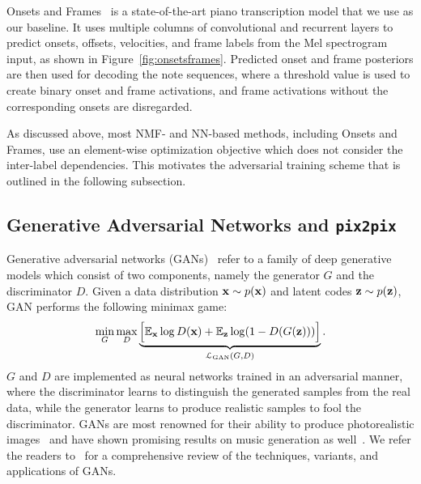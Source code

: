 Onsets and Frames~\cite{hawthorne2018onsetsframes} is a state-of-the-art piano transcription model that we use as our baseline.
It uses multiple columns of convolutional and recurrent layers to predict onsets, offsets, velocities, and frame labels from the Mel spectrogram input, as shown in Figure~\ref{fig:onsetsframes}.
Predicted onset and frame posteriors are then used for decoding the note sequences, where a threshold value is used to create binary onset and frame activations, and frame activations without the corresponding onsets are disregarded.


As discussed above, most NMF- and NN-based methods, including Onsets and Frames, use an element-wise optimization objective which does not consider the inter-label dependencies.
This motivates the adversarial training scheme that is outlined in the following subsection.

\subsection{Generative Adversarial Networks and \texttt{pix2pix}}

Generative adversarial networks (GANs)~\cite{goodfellow2014gan} refer to a family of deep generative models which consist of two components, namely the generator $G$ and the discriminator $D$.
Given a data distribution $\mathbf{x} \sim p(\mathbf{x})$ and latent codes $\mathbf{z} \sim p(\mathbf{z})$, GAN performs the following minimax game:
\begin{equation}\label{eqn:gan}
\min_{G} \max_{D} \underbrace{\Big [ \mathbb{E}_{\mathbf{x}} \log D(\mathbf{x}) + \mathbb{E}_{\mathbf{z}} \log (1 - D ( G(\mathbf{z}))) \Big ]}_{\mathcal{L}_{\text{GAN}}(G, D)}.
\end{equation}
$G$ and $D$ are implemented as neural networks trained in an adversarial manner, where the discriminator learns to distinguish the generated samples from the real data, while the generator learns to produce realistic samples to fool the discriminator.
GANs are most renowned for their ability to produce photorealistic images~\cite{karras2019stylegan} and have shown promising results on music generation as well~\cite{engel2019gansynth,dong2018musegan,yang2017midinet}.
We refer the readers to~\cite{goodfellow2016gan,creswell2017gan} for a comprehensive review of the techniques, variants, and applications of GANs.

